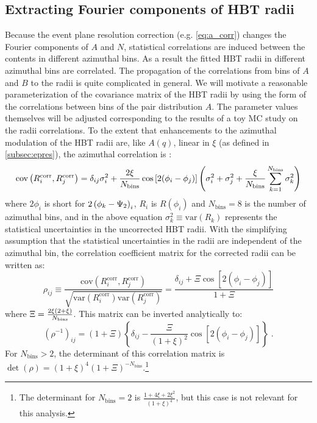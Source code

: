 \subsection{Extracting Fourier components of HBT radii}
\label{subsec:azi_correlations}

Because the event plane resolution correction (e.g. \cref{eq:a_corr}) changes the Fourier components of $A$ and $N$, statistical correlations are induced between the contents in different azimuthal bins.
As a result the fitted HBT radii in different azimuthal bins are correlated.
The propagation of the correlations from bins of $A$ and $B$ to the radii is quite complicated in general.
We will motivate a reasonable parameterization of the covariance matrix of the HBT radii by using the form of the correlations between bins of the pair distribution $A$.
The parameter values themselves will be adjusted corresponding to the results of a toy \ac{MC} study on the radii correlations.
To the extent that enhancements to the azimuthal modulation of the HBT radii are, like $A(q)$, linear in $\xi$ (as defined in \cref{subsec:epres}), the azimuthal correlation is :
\begin{equation} \label{eq:azi_corr}
\textrm{cov}\left( R^\textrm{corr}_i, R^\textrm{corr}_j \right) = \delta_{ij} \sigma^2_{i} + \frac{2\xi}{N_\textrm{bins}} \cos\left[2(\phi_i - \phi_j) \right] \left( \sigma^2_{i} + \sigma^2_{j} + \frac{\xi}{N_\textrm{bins}} \sum_{k=1}^{N_\textrm{bins}} \sigma^2_{k} \right)
\end{equation}
where $2\phi_i$ is short for $2\left(\phi_{k}-\Psi_{2}\right)_i$, $R_i$ is $R\left(\phi_i\right)$ and $N_\textrm{bins}=8$ is the number of azimuthal bins, and in the above equation $\sigma^2_{k} \equiv \mathrm{var}(R_k)$ represents the statistical uncertainties in the uncorrected HBT radii. With the simplifying assumption that the statistical uncertainties in the radii are independent of the azimuthal bin, the correlation coefficient matrix for the corrected radii can be written as:
\begin{equation} \label{eq:corr_coeff_matrix}
  \rho_{ij} \equiv \frac{\mathrm{cov}\left( R^\textrm{corr}_i, R^\textrm{corr}_j \right)}{\sqrt{\mathrm{var}\left( R^\textrm{corr}_i \right) \mathrm{var}\left( R^\textrm{corr}_j \right)}}
  = \frac{\delta_{ij} + \Xi \cos{\left[2(\phi_i-\phi_j)\right]}}{1 + \Xi}
\end{equation}
where $\Xi = \frac{2\xi(2+\xi)}{N_\textrm{bins}}$.
This matrix can be inverted analytically to:
\begin{equation} \label{eq:corr_coeff_matrix_inv}
(\rho^{-1})_{ij} = \left(1 + \Xi\right)\left\{\delta_{ij} - \frac{\Xi}{(1+\xi)^2} \cos{\left[2(\phi_i-\phi_j)\right]}\right\} \;.
\end{equation}
For $N_\textrm{bins} > 2$, the determinant of this correlation matrix is $\det(\rho) = \left(1 + \xi\right)^{4}\left(1 + \Xi \right)^{-N_\textrm{bins}}$.\footnote{The determinant for $N_\textrm{bins} = 2$ is $\frac{1+4\xi+2\xi^2}{(1+\xi)^4}$, but this case is not relevant for this analysis.}

